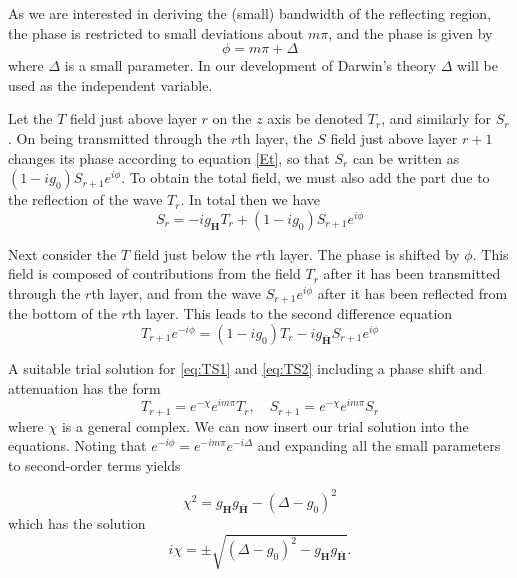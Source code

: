 \documentclass[12pt,oneside,notitlepage,abstracton,a4paper]{scrartcl}
\begin{document}
As we are interested in deriving the (small) bandwidth of the reflecting region, the phase is restricted to small deviations about $m\pi$, and the phase is given by
\begin{equation}\label{phase}
 \phi=m\pi+\Delta
\end{equation}
where $\Delta$ is a small parameter. In our development of Darwin's theory $\Delta$ will be used as the independent variable.

Let the $T$ field just above layer $r$ on the $z$ axis be denoted $T_r$, and similarly for $S_r$. On being transmitted through the $r$th layer, the $S$ field just above layer $r+1$ changes its phase according to equation \ref{Et}, so that $S_r$ can be written as $(1-ig_0)S_{r+1}e^{i\phi}$. To obtain the total field, we must also add the part due to the reflection of the wave $T_r$. In total then we have
\begin{equation}\label{eq:TS1}
 S_r=-ig_\mathbf{H}T_r+(1-ig_0)S_{r+1}e^{i\phi}
\end{equation}

Next consider the $T$ field just below the $r$th layer. The phase is shifted by $\phi$. This field is composed of contributions from the field $T_r$ after it has been transmitted through the $r$th layer, and from the wave $S_{r+1}e^{i\phi}$ after it has been reflected from the bottom of the $r$th layer. This leads to the second difference equation
\begin{equation}\label{eq:TS2}
 T_{r+1}e^{-i\phi}=(1-ig_0)T_r-ig_\mathbf{\bar{H}}S_{r+1}e^{i\phi}
\end{equation}

A suitable trial solution for \ref{eq:TS1} and \ref{eq:TS2} including a phase shift and attenuation has the form
\begin{equation}
T_{r+1}=e^{-\chi}e^{im\pi}T_r, \quad
S_{r+1}=e^{-\chi}e^{im\pi}S_r
\end{equation}
where $\chi$ is a general complex. We can now insert our trial solution into the equations. Noting that $e^{-i\phi}=e^{-im\pi}e^{-i\Delta}$ and expanding all the small parameters to second-order terms yields

\begin{equation}
\chi^2=g_\mathbf{H}g_\mathbf{\bar{H}}-(\Delta-g_0)^2
\end{equation}
which has the solution
\begin{equation}
i\chi=\pm \sqrt{(\Delta-g_0)^2-g_\mathbf{H}g_\mathbf{\bar{H}}}.
\end{equation}
\end{document}
